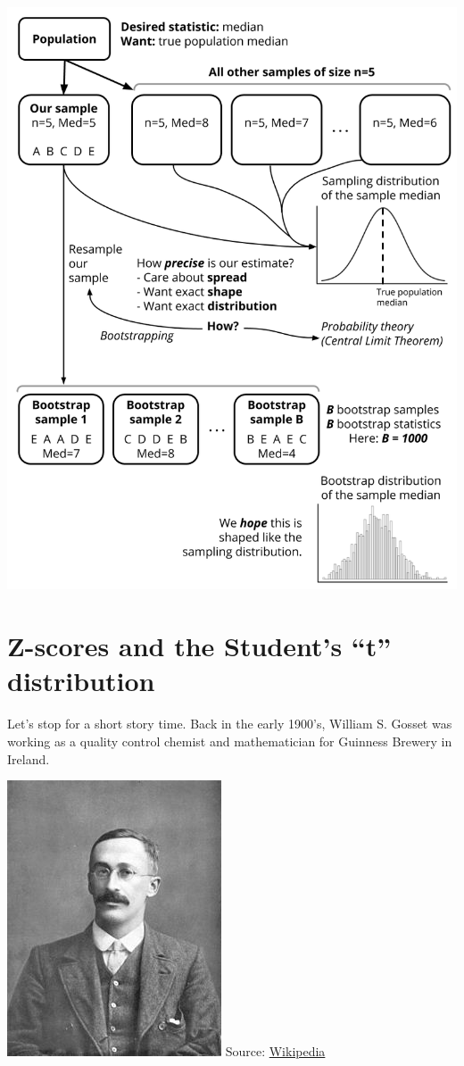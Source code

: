 \documentclass[
]{book}
\begin{document}
\includegraphics{Photos/sampling_variation_flowchart.png}

\section{Z-scores and the Student's ``t'' distribution}\label{z-scores-and-the-students-t-distribution}

Let's stop for a short story time. Back in the early 1900's, William S. Gosset was working as a quality control chemist and mathematician for Guinness Brewery in Ireland.

\includegraphics{Photos/gosset.jpg}
Source: \href{http://upload.wikimedia.org/wikipedia/commons/thumb/4/42/William_Sealy_Gosset.jpg/240px-William_Sealy_Gosset.jpg}{Wikipedia}
\end{document}
